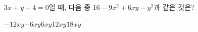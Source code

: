 $3x+y+4=0$일 때, 다음 중 $16-9x^2+6xy-y^2$과 같은 것은?
\begin{choices32}{$-12xy$}{$-6xy$}{$6xy$}{$12xy$}{$18xy$}\end{choices32}

